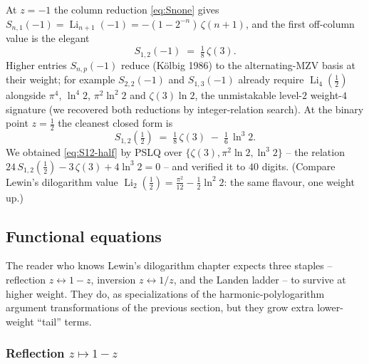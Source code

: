 \documentclass[11pt]{article}
\DeclareMathOperator{\Li}{Li}
\theoremstyle{plain}
\theoremstyle{remark}
\begin{document}
At $z=-1$ the column reduction \eqref{eq:Snone} gives $S_{n,1}(-1)=\Li_{n+1}(-1)=-(1-2^{-n})\,\zeta(n+1)$, and the first off-column value is the elegant
\begin{equation}\label{eq:S12-minus}
  S_{1,2}(-1)\;=\;\tfrac18\,\zeta(3).
\end{equation}
Higher entries $S_{n,p}(-1)$ reduce (Kölbig 1986) to the alternating-MZV basis at their weight; for example $S_{2,2}(-1)$ and $S_{1,3}(-1)$ already require $\Li_4(\tfrac12)$ alongside $\pi^4$, $\ln^4 2$, $\pi^2\ln^2 2$ and $\zeta(3)\ln 2$, the unmistakable level-$2$ weight-$4$ signature (we recovered both reductions by integer-relation search). At the binary point $z=\tfrac12$ the cleanest closed form is
\begin{equation}\label{eq:S12-half}
  \boxed{\;S_{1,2}\!\left(\tfrac12\right)\;=\;\tfrac18\,\zeta(3)\;-\;\tfrac16\,\ln^{3}2.\;}
\end{equation}
We obtained \eqref{eq:S12-half} by PSLQ over $\{\zeta(3),\pi^2\ln 2,\ln^3 2\}$ -- the relation $24\,S_{1,2}(\tfrac12)-3\,\zeta(3)+4\ln^3 2=0$ -- and verified it to $40$ digits. (Compare Lewin's dilogarithm value $\Li_2(\tfrac12)=\tfrac{\pi^2}{12}-\tfrac12\ln^2 2$: the same flavour, one weight up.)

\subsection{Functional equations}

The reader who knows Lewin's dilogarithm chapter expects three staples -- reflection $z\leftrightarrow 1-z$, inversion $z\leftrightarrow 1/z$, and the Landen ladder -- to survive at higher weight. They do, as specializations of the harmonic-polylogarithm argument transformations of the previous section, but they grow extra lower-weight ``tail'' terms.

\subsubsection*{Reflection $z\mapsto 1-z$}
\end{document}

